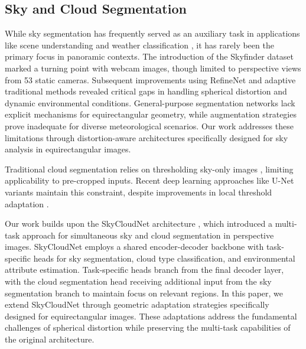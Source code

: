 \documentclass[conference]{IEEEtran}
\begin{document}


\subsection{Sky and Cloud Segmentation} 
While sky segmentation has frequently served as an auxiliary task in applications like scene understanding \cite{tsai2016} and weather classification \cite{liu2017single}, it has rarely been the primary focus in panoramic contexts. 
The introduction of the Skyfinder dataset \cite{skyfinder} marked a turning point with  webcam images, though limited to perspective views from 53 static cameras. 
Subsequent improvements using RefineNet \cite{place2019} and adaptive traditional methods \cite{nice2020sky} revealed critical gaps in handling spherical distortion and dynamic environmental conditions. 
General-purpose segmentation networks \cite{pspnet, segformer} lack explicit mechanisms for equirectangular geometry, while augmentation strategies \cite{sakaridis2018model} prove inadequate for diverse meteorological scenarios. 
Our work addresses these limitations through distortion-aware architectures specifically designed for sky analysis in equirectangular images.

Traditional cloud segmentation relies on thresholding sky-only images \cite{heinle2010, calbo2008}, limiting applicability to pre-cropped inputs. Recent deep learning approaches like U-Net variants \cite{dev2019} maintain this constraint, despite improvements in local threshold adaptation \cite{liu2014automatic}.

Our work builds upon the SkyCloudNet architecture \cite{gerhardt2023skycloud}, which introduced a multi-task approach for simultaneous sky and cloud segmentation in perspective images. SkyCloudNet employs a shared encoder-decoder backbone with task-specific heads for sky segmentation, cloud type classification, and environmental attribute estimation. 
Task-specific heads branch from the final decoder layer, with the cloud segmentation head receiving additional input from the sky segmentation branch to maintain focus on relevant regions.
In this paper, we extend SkyCloudNet through geometric adaptation strategies specifically designed for equirectangular images. 
These adaptations address the fundamental challenges of spherical distortion while preserving the multi-task capabilities of the original architecture. 
\end{document}
